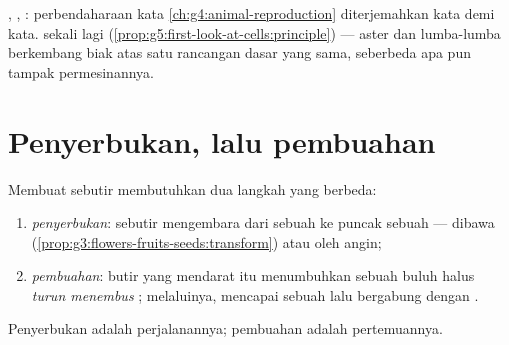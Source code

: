 \begin{remark}\label{rem:g5:flower-to-fruit:sameplan}
 , , : perbendaharaan kata
\cref{ch:g4:animal-reproduction} diterjemahkan kata demi kata.
 sekali lagi
(\cref{prop:g5:first-look-at-cells:principle}) ---  aster dan
lumba-lumba berkembang biak atas satu rancangan dasar yang sama,
seberbeda apa pun tampak permesinannya.
\end{remark}

\section{Penyerbukan, lalu pembuahan}

\begin{definition}\label{def:g5:flower-to-fruit:steps}
Membuat sebutir  membutuhkan dua langkah yang berbeda:
\begin{enumerate}
  \item \emph{penyerbukan}: sebutir 
        mengembara dari sebuah  ke puncak sebuah  ---
        dibawa 
        (\cref{prop:g3:flowers-fruits-seeds:transform}) atau oleh
        angin;
  \item \emph{pembuahan}: butir yang
        mendarat itu menumbuhkan sebuah buluh halus \emph{turun
        menembus }; melaluinya,   mencapai sebuah
         lalu bergabung dengan .
\end{enumerate}
Penyerbukan adalah perjalanannya; pembuahan adalah pertemuannya.
\end{definition}

